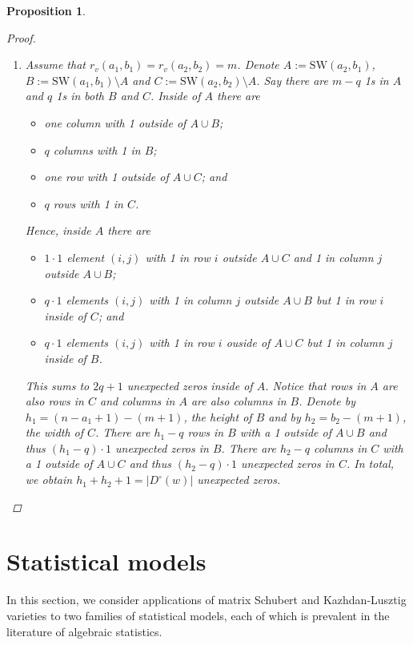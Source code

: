 \documentclass[11pt]{amsart}
\newtheorem{proposition}[theorem]{Proposition}
\theoremstyle{definition}
\theoremstyle{definition}
\theoremstyle{definition}
\theoremstyle{definition}
\newcommand{\SW}{\mathrm{SW}}
\newcommand{\Dc}{D^{\circ}}
\newcommand{\rk}{r}
\begin{document}
\begin{proposition}
\begin{proof}
\begin{enumerate}
    \item Assume that $\rk_v(a_1,b_1) = \rk_v(a_2,b_2) = m$. Denote $A:= \SW(a_2,b_1)$, $B:= \SW(a_1,b_1) \setminus A$ and $C:= \SW(a_2,b_2) \setminus A$. Say there are $m-q$ 1s in $A$ and $q$ 1s in both $B$ and $C$.
    Inside of $A$ there are 
    \begin{itemize}
    \item one column with 1 outside of $A \cup B$;
    \item $q$ columns with 1 in $B$;
    \item one row with 1 outside of $A \cup C$; and 
    \item $q$ rows with 1 in $C$. 
    \end{itemize}
    Hence, inside $A$ there are 
    \begin{itemize} 
    \item $1 \cdot 1$ element $(i,j)$ with 1 in row $i$ outside $A \cup C$ and 1 in column $j$ outside $A \cup B$; 
    \item $q \cdot 1$ elements $(i,j)$ with 1 in column $j$ outside $A\cup B$ but 1 in row $i$ inside of $C$; and 
    \item $q \cdot 1$ elements $(i,j)$ with 1 in row $i$ ouside of $A \cup C$ but 1 in column $j$ inside of $B$. 
    \end{itemize}
    This sums to $2q+1$ unexpected zeros inside of $A$. Notice that rows in $A$ are also rows in $C$ and columns in $A$ are also columns in $B$.
    Denote by $h_1 = (n-a_1+1)-(m+1)$, the height of $B$ and by $h_2 = b_2 - (m+1)$, the width of $C$. There are $h_1-q$ rows in $B$ with a 1 outside of $A \cup B$ and thus $(h_1-q)\cdot 1$ unexpected zeros in $B$. There are $h_2-q$ columns in $C$ with a 1 outside of $A \cup C$ and thus $(h_2-q)\cdot 1$ unexpected zeros in $C$. In total, we obtain $h_1+h_2+1 = |\Dc(w)|$ unexpected zeros.\qedhere
    \end{enumerate}
\end{proof}
\end{proposition}



\section{Statistical models}\label{sec: statistical models}

\noindent
In this section, we consider applications of matrix Schubert and Kazhdan-Lusztig varieties to two families of
statistical models, each of which is prevalent in the literature of algebraic statistics. 
  
\end{document}
